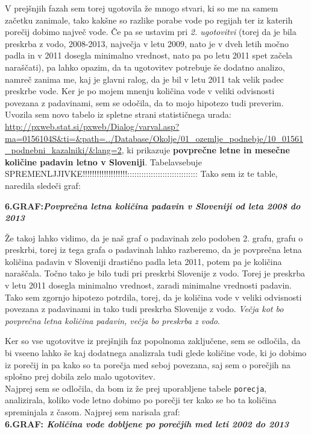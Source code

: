 \documentclass[11pt,a4paper]{article}
\begin{document}
V prejšnjih fazah sem torej ugotovila že mnogo stvari, ki so me na samem začetku zanimale, tako kakšne so razlike porabe vode po regijah ter iz katerih porečij dobimo največ vode. Če pa se ustavim pri \emph{2. ugotovitvi} (torej da je bila preskrba z vodo, 2008-2013, največja v letu 2009, nato je v dveh letih močno padla in v 2011 dosegla minimalno vrednost, nato pa po letu 2011 spet začela naraščati), pa lahko opazim, da ta ugotovitev potrebuje še dodatno analizo, namreč zanima me, kaj je glavni ralog, da je bil v letu 2011 tak velik padec preskrbe vode. Ker je po mojem mnenju količina vode v veliki odvisnosti povezana z padavinami, sem se odočila, da to mojo hipotezo tudi preverim. Uvozila sem novo tabelo iz spletne strani statističnega urada: \url{http://pxweb.stat.si/pxweb/Dialog/varval.asp?ma=0156104S&ti=&path=../Database/Okolje/01_ozemlje_podnebje/10_01561_podnebni_kazalniki/&lang=2}, ki prikazuje \textbf{povprečne letne in mesečne količine padavin letno v Sloveniji}. Tabelavsebuje SPREMENLJJIVKE!!!!!!!!!!!!!!!!!!!:::::::::::::::::::::::::::::: Tako sem iz te table, naredila sledeči graf:
\newpage

\textbf{6.GRAF:\emph{Povprečna letna količina padavin v Sloveniji od leta 2008 do 2013}}


Že takoj lahko vidimo, da je naš graf o padavinah zelo podoben 2. grafu, grafu o preskrbi, torej iz tega grafa o padavinah lahko razberemo, da je povprečna letna količina padavin v Sloveniji drastično padla leta 2011, potem pa je količina naraščala. Točno tako je bilo tudi pri preskrbi Slovenije z vodo. Torej je preskrba v letu 2011 dosegla minimalno vrednost, zaradi minimalne vrednosti padavin.  Tako sem zgornjo hipotezo potrdila, torej, da je količina vode v veliki odvisnosti povezana z padavinami in tako tudi preskrba Slovenije z vodo. \emph{Večja kot bo povprečna letna količina padavin, večja bo preskrba z vodo}.

\newpage

Ker so vse ugotovitve iz prejšnjih faz popolnoma zaključene, sem se odločila, da bi vseeno lahko še kaj dodatnega analizrala tudi glede količine vode, ki jo dobimo iz porečij in pa kako so ta porečja med seboj povezana, saj sem o porečjih na splošno prej dobila zelo malo ugotovitev.\\

Najprej sem se odločila, da bom iz že prej uporabljene tabele \verb|porecja|, analizirala, koliko vode letno dobimo po porečji ter kako se bo ta količina spreminjala z časom. Najprej sem narisala graf:\\
\textbf{6.GRAF: \emph{Količina vode dobljene po porečjih med leti 2002 do 2013}}
\end{document}
